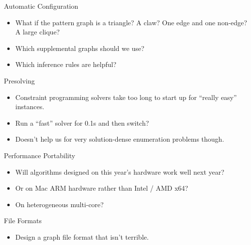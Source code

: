 \documentclass[aspectratio=169,compress,10pt]{beamer}
\begin{document}
\begin{frame}{Automatic Configuration}
    \begin{itemize}
        \item What if the pattern graph is a triangle? A claw? One edge and one non-edge? A large
            clique?
        \item <2-> Which supplemental graphs should we use?
        \item <2-> Which inference rules are helpful?
    \end{itemize}
\end{frame}

\begin{frame}{Presolving}
    \begin{itemize}
        \item Constraint programming solvers take too long to start up for ``really easy'' instances.
        \item Run a ``fast'' solver for 0.1s and then switch?
        \item <2-> Doesn't help us for very solution-dense enumeration problems though.
    \end{itemize}
\end{frame}

\begin{frame}{Performance Portability}
    \begin{itemize}
        \item Will algorithms designed on this year's hardware work well next year?
        \item <2-> Or on Mac ARM hardware rather than Intel / AMD x64?
        \item <3-> On heterogeneous multi-core?
    \end{itemize}
\end{frame}

\begin{frame}{File Formats}
    \begin{itemize}
        \item Design a graph file format that isn't terrible.
    \end{itemize}
\end{frame}
\end{document}
